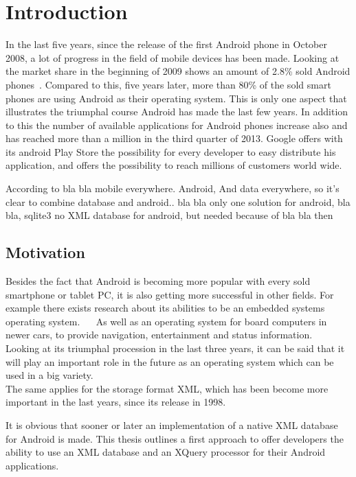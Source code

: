 \chapter{Introduction}
\label{cha:introduction}
In the last five years, since the release of the first Android phone in October 2008, a lot of progress in the field of mobile devices has been made.
Looking at the market share in the beginning of 2009 shows an amount of 2.8\% sold Android phones~\cite{gandhewar2010google}.
Compared to this, five years later, more than 80\% of the sold smart phones are using Android as their operating system.
This is only one aspect that illustrates the triumphal course Android has made the last few years.
In addition to this the number of available applications for Android phones increase also and has reached more than a million in the third quarter of 2013.
Google offers with its android Play Store the possibility for every developer to easy distribute his application, and offers the possibility to reach millions of customers world wide.


According to bla bla mobile everywhere. Android, And data everywhere, so it's clear to combine database and android.. bla bla
only one solution for android, bla bla, sqlite3
no XML database for android, but needed because of bla bla
then 

\section{Motivation}
\label{sec:introduction:motivation}
Besides the fact that Android is becoming more popular with every sold smartphone or tablet PC, it is also getting more successful in other fields.
For example there exists research about its abilities to be an embedded systems operating system. ~\cite{lee2010evaluating}~\cite{maia2010evaluating}
As well as an operating system for board computers in newer cars, to provide navigation, entertainment and status information.~\cite{macario2009vehicle}
Looking at its triumphal procession in the last three years, it can be said that it will play an important role in the future as an operating system which can be used in a big variety.\\
The same applies for the storage format XML, which has been become more important in the last years, since its release in 1998.



It is obvious that sooner or later an implementation of a native XML database for Android is made.
This thesis outlines a first approach to offer developers the ability to use an XML database and an XQuery processor for their Android applications.

